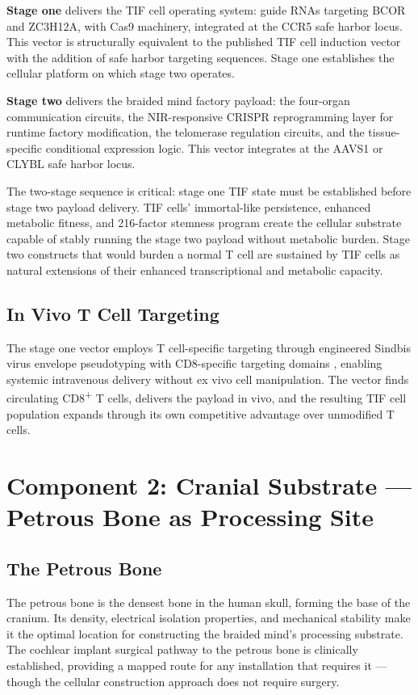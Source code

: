 \documentclass[12pt]{article}
\begin{document}
\textbf{Stage one} delivers the TIF cell operating system: guide RNAs targeting BCOR and ZC3H12A, with Cas9 machinery, integrated at the CCR5 safe harbor locus. This vector is structurally equivalent to the published TIF cell induction vector \cite{tif_cells_2024} with the addition of safe harbor targeting sequences. Stage one establishes the cellular platform on which stage two operates.

\textbf{Stage two} delivers the braided mind factory payload: the four-organ communication circuits, the NIR-responsive CRISPR reprogramming layer for runtime factory modification, the telomerase regulation circuits, and the tissue-specific conditional expression logic. This vector integrates at the AAVS1 or CLYBL safe harbor locus.

The two-stage sequence is critical: stage one TIF state must be established before stage two payload delivery. TIF cells' immortal-like persistence, enhanced metabolic fitness, and 216-factor stemness program \cite{tif_mechanism_2025} create the cellular substrate capable of stably running the stage two payload without metabolic burden. Stage two constructs that would burden a normal T cell are sustained by TIF cells as natural extensions of their enhanced transcriptional and metabolic capacity.

\subsection{In Vivo T Cell Targeting}

The stage one vector employs T cell-specific targeting through engineered Sindbis virus envelope pseudotyping with CD8-specific targeting domains \cite{invivo_car_t_2026}, enabling systemic intravenous delivery without ex vivo cell manipulation. The vector finds circulating CD8\textsuperscript{+} T cells, delivers the payload in vivo, and the resulting TIF cell population expands through its own competitive advantage over unmodified T cells.

\section{Component 2: Cranial Substrate --- Petrous Bone as Processing Site}

\subsection{The Petrous Bone}

The petrous bone is the densest bone in the human skull, forming the base of the cranium. Its density, electrical isolation properties, and mechanical stability make it the optimal location for constructing the braided mind's processing substrate. The cochlear implant surgical pathway to the petrous bone is clinically established, providing a mapped route for any installation that requires it --- though the cellular construction approach does not require surgery.
\end{document}
